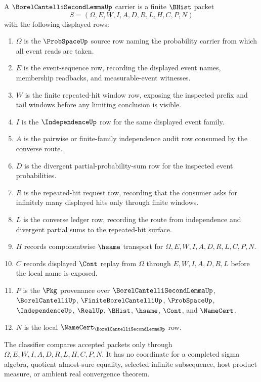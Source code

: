 \begin{definition}
\label{def:borel-cantelli-second-lemma-carrier}
A $\BorelCantelliSecondLemmaUp$ carrier is a finite $\BHist$ packet
$$
S=(\Omega,E,W,I,A,D,R,L,H,C,P,N)
$$
with the following displayed rows:
\begin{enumerate}
\item $\Omega$ is the $\ProbSpaceUp$ source row naming the probability carrier from which all event reads are taken.
\item $E$ is the event-sequence row, recording the displayed event names, membership readbacks, and measurable-event witnesses.
\item $W$ is the finite repeated-hit window row, exposing the inspected prefix and tail windows before any limiting conclusion is visible.
\item $I$ is the $\IndependenceUp$ row for the same displayed event family.
\item $A$ is the pairwise or finite-family independence audit row consumed by the converse route.
\item $D$ is the divergent partial-probability-sum row for the inspected event probabilities.
\item $R$ is the repeated-hit request row, recording that the consumer asks for infinitely many displayed hits only through finite windows.
\item $L$ is the converse ledger row, recording the route from independence and divergent partial sums to the repeated-hit surface.
\item $H$ records componentwise $\hsame$ transport for $\Omega,E,W,I,A,D,R,L,C,P,N$.
\item $C$ records displayed $\Cont$ replay from $\Omega$ through $E,W,I,A,D,R,L$ before the local name is exposed.
\item $P$ is the $\Pkg$ provenance over $\BorelCantelliSecondLemmaUp$, $\BorelCantelliUp$, $\FiniteBorelCantelliUp$, $\ProbSpaceUp$, $\IndependenceUp$, $\RealUp$, $\BHist$, $\hsame$, $\Cont$, and $\NameCert$.
\item $N$ is the local $\NameCert_{\BorelCantelliSecondLemmaUp}$ row.
\end{enumerate}
The classifier compares accepted packets only through $\Omega,E,W,I,A,D,R,L,H,C,P,N$. It has no coordinate for a completed sigma algebra, quotient almost-sure equality, selected infinite subsequence, host product measure, or ambient real convergence theorem.
\end{definition}

